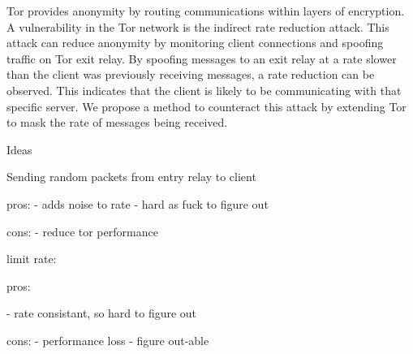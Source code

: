Tor provides anonymity by routing communications within layers of
encryption. A vulnerability in the Tor network is the indirect rate
reduction attack. This attack can reduce anonymity by monitoring client
connections and spoofing traffic on Tor exit relay. By spoofing messages
to an exit relay at a rate slower than the client was previously
receiving messages, a rate reduction can be observed. This indicates that
the client is likely to be communicating with that specific server. We
propose a method to counteract this attack by extending Tor to mask the
rate of messages being received.

Ideas

Sending random packets from entry relay to client

pros:
- adds noise to rate
- hard as fuck to figure out

cons:
- reduce tor performance


limit rate:

pros:

- rate consistant, so hard to figure out

cons:
- performance loss
- figure out-able



